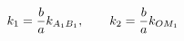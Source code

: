 \documentclass[preview]{standalone}
\begin{document}
\begin{align*}
\special{dvisvgm:raw <g id='unique000'>}k_1=\frac{b}{a}k_{A_1B_1},\qquad k_2=\frac{b}{a}k_{OM_1}\special{dvisvgm:raw </g>}
\end{align*}
\end{document}
